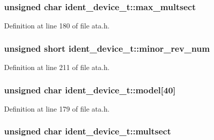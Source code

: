 \subsubsection[{\texorpdfstring{max\+\_\+multsect}{max_multsect}}]{\setlength{\rightskip}{0pt plus 5cm}unsigned char ident\+\_\+device\+\_\+t\+::max\+\_\+multsect}\hypertarget{structident__device__t_a8238d2f55c2d2f68ccdf0e20029fe636}{}\label{structident__device__t_a8238d2f55c2d2f68ccdf0e20029fe636}


Definition at line 180 of file ata.\+h.

\subsubsection[{\texorpdfstring{minor\+\_\+rev\+\_\+num}{minor_rev_num}}]{\setlength{\rightskip}{0pt plus 5cm}unsigned short ident\+\_\+device\+\_\+t\+::minor\+\_\+rev\+\_\+num}\hypertarget{structident__device__t_a32613085d76e1845af675c4559dd4288}{}\label{structident__device__t_a32613085d76e1845af675c4559dd4288}


Definition at line 211 of file ata.\+h.

\subsubsection[{\texorpdfstring{model}{model}}]{\setlength{\rightskip}{0pt plus 5cm}unsigned char ident\+\_\+device\+\_\+t\+::model\mbox{[}40\mbox{]}}\hypertarget{structident__device__t_a04219740c47641a652b946bd7bbcdaf6}{}\label{structident__device__t_a04219740c47641a652b946bd7bbcdaf6}


Definition at line 179 of file ata.\+h.

\subsubsection[{\texorpdfstring{multsect}{multsect}}]{\setlength{\rightskip}{0pt plus 5cm}unsigned char ident\+\_\+device\+\_\+t\+::multsect}\hypertarget{structident__device__t_a3be5a1bc892f8c1a4565d2a5a604a19e}{}\label{structident__device__t_a3be5a1bc892f8c1a4565d2a5a604a19e}


